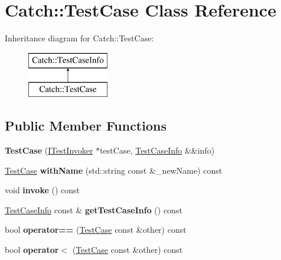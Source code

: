 \hypertarget{class_catch_1_1_test_case}{}\section{Catch\+:\+:Test\+Case Class Reference}
\label{class_catch_1_1_test_case}
Inheritance diagram for Catch\+:\+:Test\+Case\+:\begin{figure}[H]
\begin{center}
\leavevmode
\includegraphics[height=2.000000cm]{class_catch_1_1_test_case}
\end{center}
\end{figure}
\subsection*{Public Member Functions}
\begin{DoxyCompactItemize}
\item 
\mbox{\label{class_catch_1_1_test_case_aae5709fc1cb68e19ab0ac27e1ffd6a76}} 
{\bfseries Test\+Case} (\mbox{\hyperlink{struct_catch_1_1_i_test_invoker}{I\+Test\+Invoker}} $\ast$test\+Case, \mbox{\hyperlink{struct_catch_1_1_test_case_info}{Test\+Case\+Info}} \&\&info)
\item 
\mbox{\label{class_catch_1_1_test_case_a0812e8a216d09b087d5874687009f0d6}} 
\mbox{\hyperlink{class_catch_1_1_test_case}{Test\+Case}} {\bfseries with\+Name} (std\+::string const \&\+\_\+new\+Name) const
\item 
\mbox{\label{class_catch_1_1_test_case_a26f346c8446dded0562fe3818ae71651}} 
void {\bfseries invoke} () const
\item 
\mbox{\label{class_catch_1_1_test_case_a1ea0d79f49156cebea076fe1ba50d2b6}} 
\mbox{\hyperlink{struct_catch_1_1_test_case_info}{Test\+Case\+Info}} const  \& {\bfseries get\+Test\+Case\+Info} () const
\item 
\mbox{\label{class_catch_1_1_test_case_a5456d03a90f75292835c158f3a3374a1}} 
bool {\bfseries operator==} (\mbox{\hyperlink{class_catch_1_1_test_case}{Test\+Case}} const \&other) const
\item 
\mbox{\label{class_catch_1_1_test_case_a030e4b9282e9b32e08c8bd5e5cd6fa98}} 
bool {\bfseries operator$<$} (\mbox{\hyperlink{class_catch_1_1_test_case}{Test\+Case}} const \&other) const
\end{DoxyCompactItemize}
